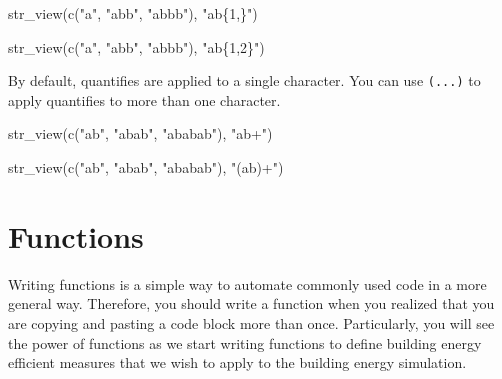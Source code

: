 \documentclass[
]{book}
\newenvironment{Shaded}{\begin{snugshade}}{\end{snugshade}}
\newcommand{\FunctionTok}[1]{\textcolor[rgb]{0.00,0.00,0.00}{#1}}
\newcommand{\NormalTok}[1]{#1}
\newcommand{\StringTok}[1]{\textcolor[rgb]{0.31,0.60,0.02}{#1}}
\begin{document}
\begin{Shaded}
\begin{Highlighting}[]
\FunctionTok{str\_view}\NormalTok{(}\FunctionTok{c}\NormalTok{(}\StringTok{"a"}\NormalTok{, }\StringTok{"abb"}\NormalTok{, }\StringTok{"abbb"}\NormalTok{), }\StringTok{"ab\{1,\}"}\NormalTok{)}
\end{Highlighting}
\end{Shaded}

\begin{Shaded}
\begin{Highlighting}[]
\FunctionTok{str\_view}\NormalTok{(}\FunctionTok{c}\NormalTok{(}\StringTok{"a"}\NormalTok{, }\StringTok{"abb"}\NormalTok{, }\StringTok{"abbb"}\NormalTok{), }\StringTok{"ab\{1,2\}"}\NormalTok{)}
\end{Highlighting}
\end{Shaded}

By default, quantifies are applied to a single character. You can use \texttt{(...)} to apply quantifies to more than one character.

\begin{Shaded}
\begin{Highlighting}[]
\FunctionTok{str\_view}\NormalTok{(}\FunctionTok{c}\NormalTok{(}\StringTok{"ab"}\NormalTok{, }\StringTok{"abab"}\NormalTok{, }\StringTok{"ababab"}\NormalTok{), }\StringTok{"ab+"}\NormalTok{)}
\end{Highlighting}
\end{Shaded}

\begin{Shaded}
\begin{Highlighting}[]
\FunctionTok{str\_view}\NormalTok{(}\FunctionTok{c}\NormalTok{(}\StringTok{"ab"}\NormalTok{, }\StringTok{"abab"}\NormalTok{, }\StringTok{"ababab"}\NormalTok{), }\StringTok{"(ab)+"}\NormalTok{)}
\end{Highlighting}
\end{Shaded}

\hypertarget{functions}{%
\chapter{Functions}\label{functions}}

Writing functions is a simple way to automate commonly used code in a more general way. Therefore, you should write a function when you realized that you are copying and pasting a code block more than once. Particularly, you will see the power of functions as we start writing functions to define building energy efficient measures that we wish to apply to the building energy simulation.
\end{document}

